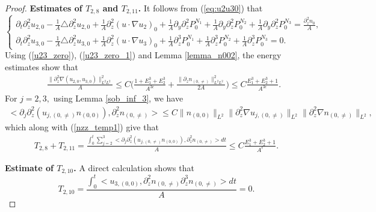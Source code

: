 \documentclass[12pt, reqno]{amsart}
\numberwithin{equation}{section}
\begin{document}
\begin{proof}
		{\bf Estimates of $T_{2,8}$ and $T_{2,11}$.} 
		It follows from (\ref{eq:u2u30}) that 
		\begin{equation*}
			\left\{
			\begin{array}{lr}
				\partial_t\partial_z^2u_{2,0}-\frac{1}{A}\triangle \partial_z^2 u_{2,0}
				+\frac{1}{A}\partial_z^2(u\cdot\nabla u_{2})_0
				+\frac{1}{A}\partial_y\partial_z^2P^{N_1}_0
				+\frac{1}{A}\partial_y\partial_z^2 P^{N_2}_0
				+\frac{1}{A}\partial_y\partial_z^2 P^{N_3}_0=\frac{\partial_z^2n_0}{A}, \\
				\partial_t\partial_z^2u_{3,0}-\frac{1}{A}\triangle \partial_z^2u_{3,0}
				+\frac{1}{A}\partial_z^2(u\cdot\nabla u_3)_0
				+\frac{1}{A}\partial_z^3P^{N_1}_0
				+\frac{1}{A}\partial_z^3P^{N_2}_0
				+\frac{1}{A}\partial_z^3P^{N_3}_0=0.
			\end{array}
			\right.
		\end{equation*}	
		Using (\ref{u23_zero}), (\ref{u23_zero_1}) and Lemma \ref{lemma_n002}, the energy estimates show that
		\begin{equation}\label{nzz_temp1}
			\begin{aligned}
				&\quad
				\frac{\|\partial_z^2\nabla (u_{2,0},u_{3,0})\|_{L^2L^2}^2}{A}
				\leq C\Big(\frac{1+E_1^3+E_2^3}{A^{3\epsilon}}
				+\frac{\|\partial_z n_{(0,\neq)}\|_{L^2L^2}^2}{2A}\Big)
				\leq C\frac{E_1^3+E_2^3+1}{A^{3\epsilon}}.
			\end{aligned}
		\end{equation}
		For $j=2,3,$ using Lemma \ref{sob_inf_3},
		we have 
		\begin{equation*}
			\begin{aligned}
				<\partial_j\partial_z^2(u_{j,(0,\neq)}n_{(0,0)}),
				\partial_z^2n_{(0,\neq)}>
				\leq C\|n_{(0,0)}\|_{L^2}
				\|\partial_z^2\nabla u_{j,(0,\neq)}\|_{L^2}
				\|\partial_z^2\nabla n_{(0,\neq)}\|_{L^2},
			\end{aligned}
		\end{equation*}
		which along with (\ref{nzz_temp1}) give that 
		\begin{equation*}
			\begin{aligned}
				T_{2,8}+T_{2,11}=\frac{\int_{0}^t\sum_{j=2}^3<\partial_j\partial_z^2(u_{j,(0,\neq)}n_{(0,0)}),
					\partial_z^2n_{(0,\neq)}>dt}{A}\leq C\frac{E_1^3+E_2^3+1}{A^{\epsilon}}.
			\end{aligned}
		\end{equation*}
		
		{\bf Estimate of $T_{2,10}$.} 
		A direct calculation shows that 
		\begin{equation*}
			T_{2,10}=
			\frac{\int_0^t<u_{3,(0,0)},\partial_z^2n_{(0,\neq)}
				\partial_z^3n_{(0,\neq)}>dt}{A}=0.
		\end{equation*}
		

\end{proof}
\end{document}
